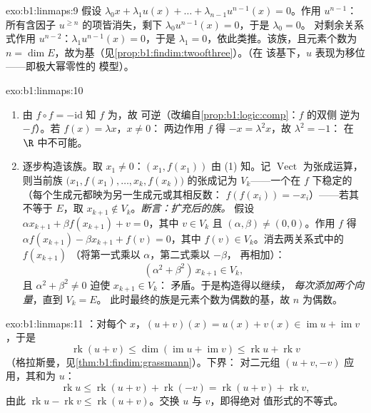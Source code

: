 \begin{solution}{exo:b1:linmaps:9}
假设 $\lambda_0 x + \lambda_1 u(x) + \dots + \lambda_{n-1}
u^{n-1}(x) = 0$。作用 $u^{n-1}$：所有含因子 $u^{\geq
n}$ 的项皆消失，剩下 $\lambda_0 u^{n-1}(x) = 0$，于是 $\lambda_0 = 0$。
对剩余关系式作用 $u^{n-2}$：$\lambda_1 u^{n-1}(x) =
0$，于是 $\lambda_1 = 0$，依此类推。该族，且元素个数为
$n = \dim E$，故为基（见\cref{prop:b1:findim:twoofthree}）。（在
该基下，$u$ 表现为移位——即极大幂零性的
模型）。
\end{solution}

\begin{solution}{exo:b1:linmaps:10}
\begin{enumerate}
  \item 由 $f \circ f = -\mathrm{id}$ 知 $f$ 为，故
        可逆（改编自\cref{prop:b1:logic:comp}：$f$ 的双侧
        逆为 $-f$）。若 $f(x) = \lambda x$，$x \neq 0$：
        两边作用 $f$ 得 $-x = \lambda^2 x$，故 $\lambda^2 = -1$：
        在 $\R$ 中不可能。
  \item 逐步构造该族。取 $x_1 \neq 0$：$(x_1,
        f(x_1))$ 由 (1) 知。记 $\operatorname{Vect}$ 为张成运算，
        则当前族 $\bigl(x_1, f(x_1), \dots, x_k,
        f(x_k)\bigr)$ 的张成记为 $V_k$——一个在 $f$ 下稳定的
        （每个生成元都映为另一生成元或其相反数：
        $f(f(x_i)) = -x_i$）——若其不等于 $E$，取 $x_{k+1}
        \notin V_k$。\emph{断言：扩充后的族。}
        假设 $\alpha x_{k+1} + \beta f(x_{k+1}) + v = 0$，其中 $v
        \in V_k$ 且 $(\alpha, \beta) \neq (0,0)$。作用 $f$ 得
        $\alpha f(x_{k+1}) - \beta x_{k+1} + f(v) = 0$，其中 $f(v)
        \in V_k$。消去两关系式中的 $f(x_{k+1})$
        （将第一式乘以 $\alpha$，第二式乘以 $-\beta$，
        再相加）：
        \[
        (\alpha^2 + \beta^2)\, x_{k+1} \in V_k ,
        \]
        且 $\alpha^2 + \beta^2 \neq 0$ 迫使 $x_{k+1} \in V_k$：
        矛盾。于是构造得以继续，
        \emph{每次添加两个向量}，直到 $V_k = E$。
        此时最终的族是元素个数为偶数的基，故 $n$ 为偶数。
\end{enumerate}
\end{solution}

\begin{solution}{exo:b1:linmaps:11}
：对每个 $x$，$(u + v)(x) = u(x) + v(x) \in
\operatorname{im} u + \operatorname{im} v$，于是
\[
\operatorname{rk}(u + v)
\leq \dim(\operatorname{im} u + \operatorname{im} v)
\leq \operatorname{rk} u + \operatorname{rk} v
\]
（格拉斯曼，见\cref{thm:b1:findim:grassmann}）。下界：
对二元组 $(u + v, -v)$ 应用，其和为 $u$：
\[
\operatorname{rk} u \leq \operatorname{rk}(u + v) +
\operatorname{rk}(-v) = \operatorname{rk}(u + v) +
\operatorname{rk} v,
\]
由此 $\operatorname{rk} u - \operatorname{rk} v \leq
\operatorname{rk}(u+v)$。交换 $u$ 与 $v$，即得绝对
值形式的不等式。
\end{solution}

